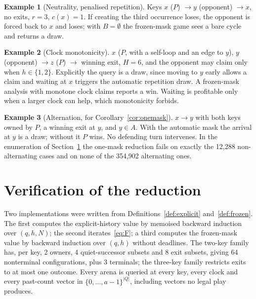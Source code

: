 \documentclass[journal]{IEEEtran}
\theoremstyle{definition}
\newtheorem{example}{Example}
\theoremstyle{remark}
\begin{document}
\begin{example}[Neutrality, penalised repetition]
Keys $x$ ($P$) $\to y$ (opponent) $\to x$, no exits, $r=3$, $c(x)=1$. If creating the third occurrence loses, the opponent is forced back to $x$ and loses; with $B=\emptyset$ the frozen-mask game sees a bare cycle and returns a draw.
\end{example}

\begin{example}[Clock monotonicity]
$x$ ($P$, with a self-loop and an edge to $y$), $y$ (opponent) $\to z$ ($P$) $\to$ winning exit, $H=6$, and the opponent may claim only when $h\in\{1,2\}$. Explicitly the query is a draw, since moving to $y$ early allows a claim and waiting at $x$ triggers the automatic repetition draw. A frozen-mask analysis with monotone clock claims reports a win. Waiting is profitable only when a larger clock can help, which monotonicity forbids.
\end{example}

\begin{example}[Alternation, for Corollary~\ref{cor:onemask}]
$x\to y$ with both keys owned by $P$, a winning exit at $y$, and $y\in A$. With the automatic mask the arrival at $y$ is a draw; without it $P$ wins. No defending turn intervenes. In the enumeration of Section~\ref{sec:abstract-exp} the one-mask reduction fails on exactly the 12{,}288 non-alternating cases and on none of the 354{,}902 alternating ones.
\end{example}

\section{Verification of the reduction}\label{sec:abstract-exp}

Two implementations were written from Definitions~\ref{def:explicit} and~\ref{def:frozen}. The first computes the explicit-history value by memoised backward induction over $(q,h,N)$; the second iterates~\eqref{eq:F}; a third computes the frozen-mask value by backward induction over $(q,h)$ without deadlines. The two-key family has, per key, 2 owners, 4 quiet-successor subsets and 8 exit subsets, giving 64 nonterminal configurations, plus 3 terminals; the three-key family restricts exits to at most one outcome. Every arena is queried at every key, every clock and every past-count vector in $\{0,\dots,a-1\}^{|Q|}$, including vectors no legal play produces.
\end{document}
